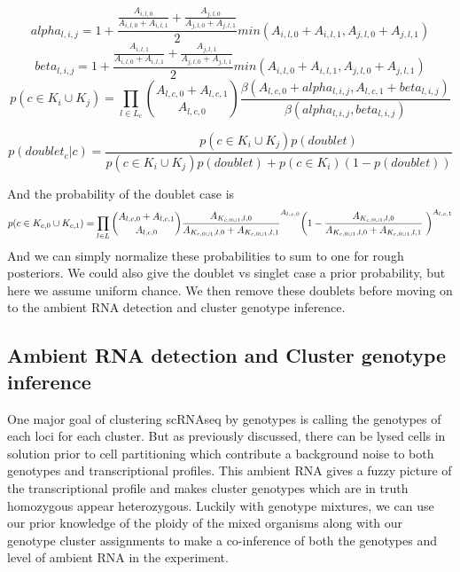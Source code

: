 \begin{equation}
alpha_{l,i,j} = 1+ \frac{\frac{A_{i,l,0}}{A_{i,l,0}+A_{i,l,1}} +  \frac{A_{j,l,0}}{A_{j,l,0}+A_{j,l,1}}}{2}min(A_{i,l,0}+A_{i,l,1}, A_{j,l,0}+A_{j,l,1})
\end{equation}
\begin{equation}
beta_{l,i,j} = 1+ \frac{\frac{A_{i,l,1}}{A_{i,l,0}+A_{i,l,1}} +  \frac{A_{j,l,1}}{A_{j,l,0}+A_{j,l,1}}}{2}min(A_{i,l,0}+A_{i,l,1}, A_{j,l,0}+A_{j,l,1})
\end{equation}
\begin{equation}
p(c \in K_{i} \cup K_{j}) = \prod_{l \in L_c} \binom{A_{l,c,0} + A_{l,c,1}}{A_{l,c,0}} \frac{\beta (A_{l,c,0} + alpha_{l,i,j}, A_{l,c,1} + beta_{l,i,j})}{\beta (alpha_{l,i,j},  beta_{l,i,j})}
\end{equation}

\begin{equation}
p(doublet_c | c) = \frac{p(c \in K_{i} \cup K_{j})p(doublet)}{p(c \in K_{i} \cup K_{j})p(doublet) + p(c \in K_i)(1-p(doublet))}
\end{equation}

And the probability of the doublet case is 
\begin{equation}
p(c \in K_{c,0} \cup K_{c,1}) =  \prod_{l \in L} \binom{A_{l,c,0} + A_{l,c,1}}{A_{l,c,0}} 
\frac{A_{K_{c,0 \cup 1},l,0}}{A_{K_{c,0 \cup 1},l,0} + A_{K_{c,0 \cup 1},l,1}}^{A_{l,c,0}} \bigg(1-\frac{A_{K_{c,0 \cup 1},l,0}}{A_{K_{c,0 \cup 1},l,0} + A_{K_{c,0 \cup 1},l,1}}\biggm)^{A_{l,c,1}}
\end{equation}
And we can simply normalize these probabilities to sum to one for rough posteriors. We could also give the doublet vs singlet case a prior probability, but here we assume uniform chance. We then remove these doublets before moving on to the ambient RNA detection and cluster genotype inference.


\subsection{Ambient RNA detection and Cluster genotype inference}
One major goal of clustering scRNAseq by genotypes is calling the genotypes of each loci for each cluster.
But as previously discussed, there can be lysed cells in solution prior to cell partitioning which contribute a background noise to both genotypes and transcriptional profiles. 
This ambient RNA gives a fuzzy picture of the transcriptional profile and makes cluster genotypes which are in truth homozygous appear heterozygous. 
Luckily with genotype mixtures, we can use our prior knowledge of the ploidy of the mixed organisms along with our genotype cluster assignments to 
make a co-inference of both the genotypes and level of ambient RNA in the experiment.

